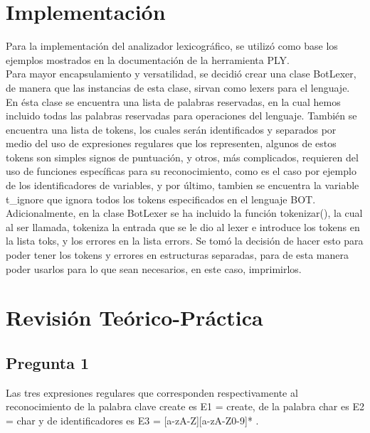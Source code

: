 \documentclass{article}
\begin{document}
\section{Implementación}
\hspace{0.5cm} Para la implementación del analizador lexicográfico, se utilizó como base los ejemplos mostrados en la documentación de la herramienta PLY. \\

\hspace{0.5cm} Para mayor encapsulamiento y versatilidad, se decidió crear una clase BotLexer, de manera que las instancias de esta clase, sirvan como lexers para el lenguaje. En ésta clase se encuentra una lista de palabras reservadas, en la cual hemos incluido todas las palabras reservadas para operaciones del lenguaje. También se encuentra una lista de tokens, los cuales serán identificados y separados por medio del uso de expresiones regulares que los representen, algunos de estos tokens son simples signos de puntuación, y otros, más complicados, requieren del uso de funciones específicas para su reconocimiento, como es el caso por ejemplo de los identificadores de variables, y por último, tambien se encuentra la variable t\_ignore que ignora todos los tokens especificados en el lenguaje BOT. \\

\hspace{0.5cm} Adicionalmente, en la clase BotLexer se ha incluido la función tokenizar(), la cual al ser llamada, tokeniza la entrada que se le dio al lexer e introduce los tokens en la lista toks, y los errores en la lista errors. Se tomó la decisión de hacer esto para poder tener los tokens y errores en estructuras separadas, para de esta manera poder usarlos para lo que sean necesarios, en este caso, imprimirlos.

\newpage

\section{Revisión Teórico-Práctica}
\subsection{Pregunta 1}
\hspace{0.5cm} Las tres expresiones regulares que corresponden respectivamente al reconocimiento de la palabra clave create es E1 = create, de la palabra char es E2 = char y de identificadores es E3 = [a-zA-Z][a-zA-Z0-9]* . 
\end{document}
